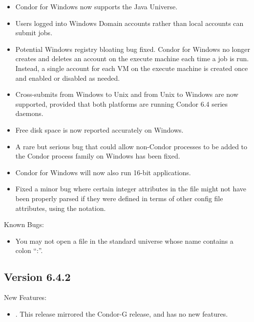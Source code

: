 \begin{itemize}
\item Condor for Windows now supports the Java Universe.

\item Users logged into Windows Domain accounts rather than local accounts
can submit jobs.

\item Potential Windows registry bloating bug fixed. Condor for Windows no
longer creates and deletes an account on the execute machine each time a
job is run. Instead, a single account for each VM on the execute machine is
created once and enabled or disabled as needed.

\item Cross-submits from Windows to Unix and from Unix to Windows are now
supported, provided that both platforms are running Condor 6.4 series daemons.

\item Free disk space is now reported accurately on Windows.

\item A rare but serious bug that could allow non-Condor processes to be added
to the Condor process family on Windows has been fixed.

\item Condor for Windows will now also run 16-bit applications.

\item Fixed a minor bug where certain integer attributes in the
 file might not have been properly parsed if they
were defined in terms of other config file attributes, using the
 notation.  

\end{itemize}

\noindent Known Bugs:
\begin{itemize}

\item You may not open a file in the standard universe whose name contains a
colon ``:''.

\end{itemize}

\subsection{\label{sec:New-6-4-2}Version 6.4.2}
\noindent New Features:
\begin{itemize}

\item. This release mirrored the Condor-G release, and has no new features.

\end{itemize}


